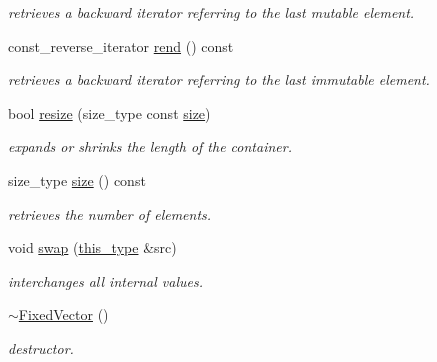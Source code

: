 \begin{DoxyCompactItemize}
\begin{DoxyCompactList}\small\item\em retrieves a backward iterator referring to the last mutable element. \end{DoxyCompactList}\item 
\hypertarget{classhryky_1_1_fixed_vector_af81ad25d79bc3d9a9f3655ced8d33d0d}{const\-\_\-reverse\-\_\-iterator \hyperlink{classhryky_1_1_fixed_vector_af81ad25d79bc3d9a9f3655ced8d33d0d}{rend} () const }\label{classhryky_1_1_fixed_vector_af81ad25d79bc3d9a9f3655ced8d33d0d}

\begin{DoxyCompactList}\small\item\em retrieves a backward iterator referring to the last immutable element. \end{DoxyCompactList}\item 
\hypertarget{classhryky_1_1_fixed_vector_a2e96859883b376cebe3b2e41c02c9e9a}{bool \hyperlink{classhryky_1_1_fixed_vector_a2e96859883b376cebe3b2e41c02c9e9a}{resize} (size\-\_\-type const \hyperlink{classhryky_1_1_fixed_vector_a5213839602f1eabaa2e8ad064407e6bc}{size})}\label{classhryky_1_1_fixed_vector_a2e96859883b376cebe3b2e41c02c9e9a}

\begin{DoxyCompactList}\small\item\em expands or shrinks the length of the container. \end{DoxyCompactList}\item 
\hypertarget{classhryky_1_1_fixed_vector_a5213839602f1eabaa2e8ad064407e6bc}{size\-\_\-type \hyperlink{classhryky_1_1_fixed_vector_a5213839602f1eabaa2e8ad064407e6bc}{size} () const }\label{classhryky_1_1_fixed_vector_a5213839602f1eabaa2e8ad064407e6bc}

\begin{DoxyCompactList}\small\item\em retrieves the number of elements. \end{DoxyCompactList}\item 
\hypertarget{classhryky_1_1_fixed_vector_a6b0a09a540438463dd2017419a6a600e}{void \hyperlink{classhryky_1_1_fixed_vector_a6b0a09a540438463dd2017419a6a600e}{swap} (\hyperlink{classhryky_1_1_fixed_vector}{this\-\_\-type} \&src)}\label{classhryky_1_1_fixed_vector_a6b0a09a540438463dd2017419a6a600e}

\begin{DoxyCompactList}\small\item\em interchanges all internal values. \end{DoxyCompactList}\item 
\hypertarget{classhryky_1_1_fixed_vector_a690537d2311ebad8ee5d89acbef71800}{\hyperlink{classhryky_1_1_fixed_vector_a690537d2311ebad8ee5d89acbef71800}{$\sim$\-Fixed\-Vector} ()}\label{classhryky_1_1_fixed_vector_a690537d2311ebad8ee5d89acbef71800}

\begin{DoxyCompactList}\small\item\em destructor. \end{DoxyCompactList}\end{DoxyCompactItemize}
